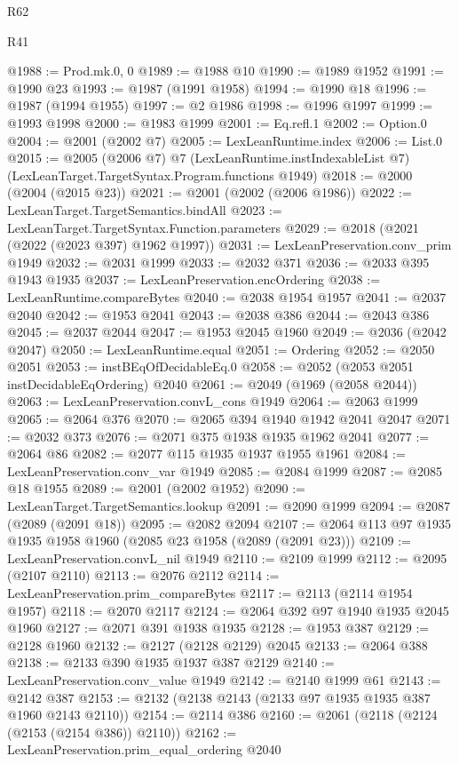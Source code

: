 \begin{lexlean}{R62}
\begin{lexlean}{R41}
\begin{coremodule}
{{{{{{{{{{{{{{{{{{{{{{{{{{{{{{{{{{{{{{{{{{{{{{{{{{{{{{{{{{{{{{{{{{{{{{{{{{{{{{{{{{{{{{{@1988 := Prod.mk.{0, 0}
@1989 := @1988 @10
@1990 := @1989 @1952
@1991 := @1990 @23
@1993 := @1987 (@1991 @1958)
@1994 := @1990 @18
@1996 := @1987 (@1994 @1955)
@1997 := @2 @1986
@1998 := @1996 @1997
@1999 := @1993 @1998
@2000 := @1983 @1999
@2001 := Eq.refl.{1}
@2002 := Option.{0}
@2004 := @2001 (@2002 @7)
@2005 := LexLeanRuntime.index
@2006 := List.{0}
@2015 := @2005
    (@2006 @7)
    @7
    (LexLeanRuntime.instIndexableList @7)
    (LexLeanTarget.TargetSyntax.Program.functions @1949)
@2018 := @2000 (@2004 (@2015 @23))
@2021 := @2001 (@2002 (@2006 @1986))
@2022 := LexLeanTarget.TargetSemantics.bindAll
@2023 := LexLeanTarget.TargetSyntax.Function.parameters
@2029 := @2018 (@2021 (@2022 (@2023 @397) @1962 @1997))
@2031 := LexLeanPreservation.conv_prim @1949
@2032 := @2031 @1999
@2033 := @2032 @371
@2036 := @2033 @395 @1943 @1935
@2037 := LexLeanPreservation.encOrdering
@2038 := LexLeanRuntime.compareBytes
@2040 := @2038 @1954 @1957
@2041 := @2037 @2040
@2042 := @1953 @2041
@2043 := @2038 @386
@2044 := @2043 @386
@2045 := @2037 @2044
@2047 := @1953 @2045 @1960
@2049 := @2036 (@2042 @2047)
@2050 := LexLeanRuntime.equal
@2051 := Ordering
@2052 := @2050 @2051
@2053 := instBEqOfDecidableEq.{0}
@2058 := @2052 (@2053 @2051 instDecidableEqOrdering) @2040
@2061 := @2049 (@1969 (@2058 @2044))
@2063 := LexLeanPreservation.convL_cons @1949
@2064 := @2063 @1999
@2065 := @2064 @376
@2070 := @2065 @394 @1940 @1942 @2041 @2047
@2071 := @2032 @373
@2076 := @2071 @375 @1938 @1935 @1962 @2041
@2077 := @2064 @86
@2082 := @2077 @115 @1935 @1937 @1955 @1961
@2084 := LexLeanPreservation.conv_var @1949
@2085 := @2084 @1999
@2087 := @2085 @18 @1955
@2089 := @2001 (@2002 @1952)
@2090 := LexLeanTarget.TargetSemantics.lookup
@2091 := @2090 @1999
@2094 := @2087 (@2089 (@2091 @18))
@2095 := @2082 @2094
@2107 := @2064 @113 @97 @1935 @1935 @1958 @1960 (@2085 @23 @1958 (@2089 (@2091 @23)))
@2109 := LexLeanPreservation.convL_nil @1949
@2110 := @2109 @1999
@2112 := @2095 (@2107 @2110)
@2113 := @2076 @2112
@2114 := LexLeanPreservation.prim_compareBytes
@2117 := @2113 (@2114 @1954 @1957)
@2118 := @2070 @2117
@2124 := @2064 @392 @97 @1940 @1935 @2045 @1960
@2127 := @2071 @391 @1938 @1935
@2128 := @1953 @387
@2129 := @2128 @1960
@2132 := @2127 (@2128 @2129) @2045
@2133 := @2064 @388
@2138 := @2133 @390 @1935 @1937 @387 @2129
@2140 := LexLeanPreservation.conv_value @1949
@2142 := @2140 @1999 @61
@2143 := @2142 @387
@2153 := @2132 (@2138 @2143 (@2133 @97 @1935 @1935 @387 @1960 @2143 @2110))
@2154 := @2114 @386
@2160 := @2061 (@2118 (@2124 (@2153 (@2154 @386)) @2110))
@2162 := LexLeanPreservation.prim_equal_ordering @2040
}}}}}}}}}}}}}}}}}}}}}}}}}}}}}}}}}}}}}}}}}}}}}}}}}}}}}}}}}}}}}}}}}}}}}}}}}}}}}}}}}}}}}}}
\end{coremodule}
\end{lexlean}
\end{lexlean}
